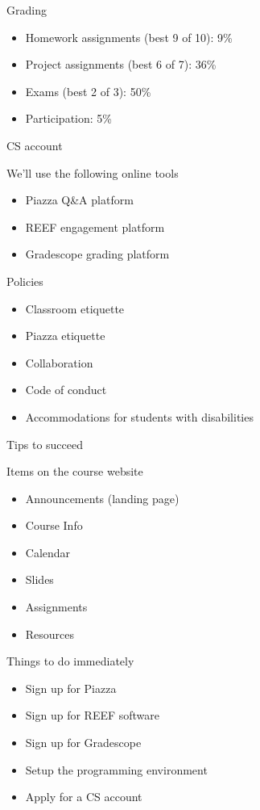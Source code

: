 \documentclass[8pt,a4paper,compress]{beamer}
\begin{document}
\begin{frame}[fragile]
\pause

Grading
\begin{itemize}
\item Homework assignments (best 9 of 10): 9\%
\item Project assignments (best 6 of 7): 36\%
\item Exams (best 2 of 3): 50\%
\item Participation: 5\%
\end{itemize}

\pause
\bigskip

CS account

\pause
\bigskip

We'll use the following online tools
\begin{itemize}
\item Piazza Q\&A platform
\item REEF engagement platform
\item Gradescope grading platform
\end{itemize}

\pause
\bigskip

Policies
\begin{itemize}
\item Classroom etiquette
\item Piazza etiquette
\item Collaboration
\item Code of conduct
\item Accommodations for students with disabilities
\end{itemize}

\pause
\bigskip

Tips to succeed
\end{frame}

\begin{frame}[fragile]
\pause

Items on the course website
\begin{itemize}
\item Announcements (landing page)
\item Course Info
\item Calendar
\item Slides 
\item Assignments
\item Resources
\end{itemize}

\pause
\bigskip

Things to do immediately
\begin{itemize}
\item Sign up for Piazza
\item Sign up for REEF software
\item Sign up for Gradescope
\item Setup the programming environment
\item Apply for a CS account
\end{itemize}
\end{frame}
\end{document}
